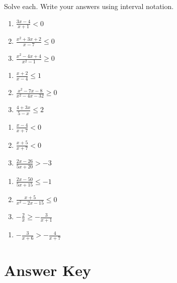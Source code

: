 Solve each. Write your answers using interval notation.
\begin{multicols}{3}
\begin{enumerate}
\setlength\itemsep{10pt}
\item $\frac{3x-4}{x+1}<0$
\item $\frac{x^2+3x+2}{x-7} \leq 0$
\item $\frac{x^2-4x+4}{x^2-1} \geq 0$
\end{enumerate} \setcounter{Review}{\value{enumi}}
\end{multicols}
\begin{multicols}{3}
\begin{enumerate}	\setcounter{enumi}{\value{Review}}
\item $\frac{x+2}{x-4} \leq 1$
\item $\frac{x^2-7x-8}{x^2-4x-32} \geq 0$
\item $\frac{4+3x}{5-x} \leq 2$
\end{enumerate} \setcounter{Review}{\value{enumi}}
\end{multicols}
\begin{multicols}{3}
\begin{enumerate}	\setcounter{enumi}{\value{Review}}
\item $\frac{x-4}{x+7} < 0$
\item $\frac{x+5}{x+7} < 0$
\item $\frac{2x-26}{5x+20} > -3$
\end{enumerate} \setcounter{Review}{\value{enumi}}
\end{multicols}
\begin{multicols}{3}
\begin{enumerate}	\setcounter{enumi}{\value{Review}}
\item $\frac{2x-50}{5x+15} \leq -1$
\item $\frac{x+5}{x^2-2x-15} \leq 0$
\item $-\frac{2}{x} \geq - \frac{3}{x+1}$
\end{enumerate} \setcounter{Review}{\value{enumi}}
\end{multicols}
\begin{multicols}{3}
\begin{enumerate}	\setcounter{enumi}{\value{Review}}
\item $-\frac{3}{x+6} > -\frac{4}{x+7}$
\end{enumerate}
\end{multicols}

\newpage

\section{Answer Key}

